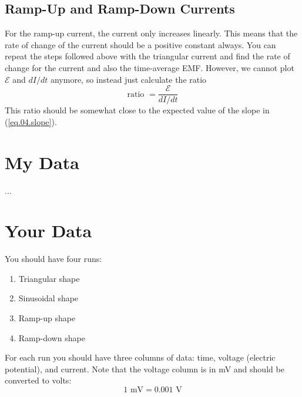\subsection{Ramp-Up and Ramp-Down Currents}
For the ramp-up current, the current only increases linearly. This means that the rate of change of the current should be a positive constant always. You can repeat the steps followed above with the triangular current and find the rate of change for the current and also the time-average EMF. However, we cannot plot $\mathcal{E}$ and $dI/dt$ anymore, so instead just calculate the ratio
\begin{equation}
	\text{ratio } = \frac{\mathcal{E}}{dI/dt}
\end{equation}
This ratio should be somewhat close to the expected value of the slope in (\ref{eq.04.slope}).
\section{My Data}
...
\section{Your Data}
You should have four runs:
\begin{enumerate}
	\item Triangular shape
	\item Sinusoidal shape
	\item Ramp-up shape
	\item Ramp-down shape
\end{enumerate}
For each run you should have three columns of data: time, voltage (electric potential), and current. Note that the voltage column is in mV and should be converted to volts:
\begin{equation}
	1 \text{ mV} = 0.001 \text{ V}
\end{equation}
